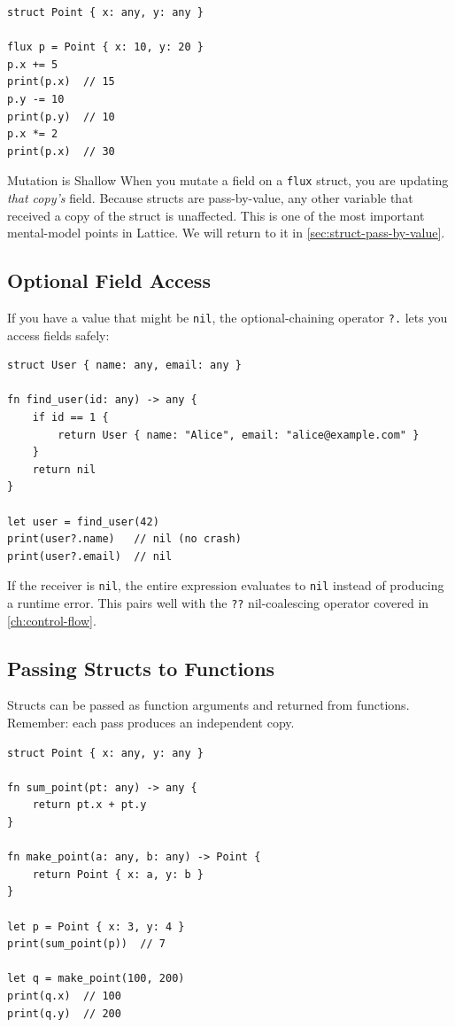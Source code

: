 \begin{lstlisting}[language=Lattice, caption={Compound field assignment}]
struct Point { x: any, y: any }

flux p = Point { x: 10, y: 20 }
p.x += 5
print(p.x)  // 15
p.y -= 10
print(p.y)  // 10
p.x *= 2
print(p.x)  // 30
\end{lstlisting}

\begin{warnbox}{Mutation is Shallow}
When you mutate a field on a \lstinline|flux| struct, you are updating
\emph{that copy's} field. Because structs are pass-by-value, any other
variable that received a copy of the struct is unaffected. This is one of
the most important mental-model points in Lattice. We will return to it in
\cref{sec:struct-pass-by-value}.
\end{warnbox}

\subsection{Optional Field Access}

If you have a value that might be \lstinline|nil|, the optional-chaining
operator \lstinline|?.| lets you access fields safely:

\begin{lstlisting}[language=Lattice, caption={Optional field access}]
struct User { name: any, email: any }

fn find_user(id: any) -> any {
    if id == 1 {
        return User { name: "Alice", email: "alice@example.com" }
    }
    return nil
}

let user = find_user(42)
print(user?.name)   // nil (no crash)
print(user?.email)  // nil
\end{lstlisting}

If the receiver is \lstinline|nil|, the entire expression evaluates to
\lstinline|nil| instead of producing a runtime error. This pairs well
with the \lstinline|??| nil-coalescing operator covered in
\cref{ch:control-flow}.

\subsection{Passing Structs to Functions}

Structs can be passed as function arguments and returned from functions.
Remember: each pass produces an independent copy.

\begin{lstlisting}[language=Lattice, caption={Structs as arguments and return values}]
struct Point { x: any, y: any }

fn sum_point(pt: any) -> any {
    return pt.x + pt.y
}

fn make_point(a: any, b: any) -> Point {
    return Point { x: a, y: b }
}

let p = Point { x: 3, y: 4 }
print(sum_point(p))  // 7

let q = make_point(100, 200)
print(q.x)  // 100
print(q.y)  // 200
\end{lstlisting}


